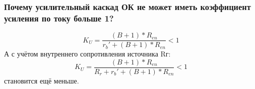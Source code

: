 \subsubsection{Почему усилительный каскад ОК не может иметь коэффициент усиления по току больше 1?}

$$
K_{U}=\frac{(B+1)*R_{en}}{r_{b}'+(B+1)*R_{en}}<1
$$
А с учётом внутреннего сопротивления источника Rг:
$$
K_{U}=\frac{(B+1)*R_{en}}{R_{r}+r_{b}'+(B+1)*R_{en}}<1
$$
становится ещё меньше.
